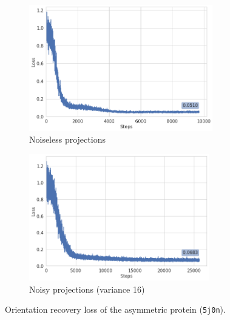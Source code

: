 \begin{figure}
    \centering
    \begin{subfigure}[b]{0.45\textwidth}
        \includegraphics[height=5.5cm]{images/5j0n_noise0_angle_recovery.png}
        \caption{Noiseless projections}
    \end{subfigure}
    \hfill
    \begin{subfigure}[b]{0.5\textwidth}
    \centering
        \includegraphics[height=5.5cm]{images/5j0n_noise16_angle_recovery.png}
        \caption{Noisy projections (variance 16)}
    \end{subfigure}
    \caption{ Orientation recovery loss of the asymmetric protein (\texttt{5j0n}).}
    \label{fig:orientation-recovery-loss}
\end{figure}

